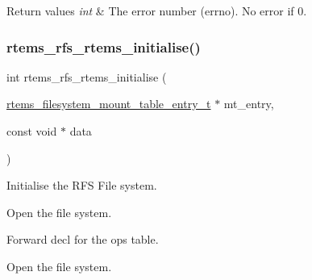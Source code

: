 \begin{DoxyRetVals}{Return values}
{\em int} & The error number (errno). No error if 0. \\
\hline
\end{DoxyRetVals}
\mbox{\label{group__rtems__rfs_gaf07230e2a00d753c32235965ba8ca4ad}} 
\subsubsection{\texorpdfstring{rtems\_rfs\_rtems\_initialise()}{rtems\_rfs\_rtems\_initialise()}}
{\footnotesize\ttfamily int rtems\+\_\+rfs\+\_\+rtems\+\_\+initialise (\begin{DoxyParamCaption}\item[{\mbox{\hyperlink{structrtems__filesystem__mount__table__entry__tt}{rtems\+\_\+filesystem\+\_\+mount\+\_\+table\+\_\+entry\+\_\+t}} $\ast$}]{mt\+\_\+entry,  }\item[{const void $\ast$}]{data }\end{DoxyParamCaption})}

Initialise the R\+FS File system.

Open the file system.

Forward decl for the ops table.

Open the file system. 